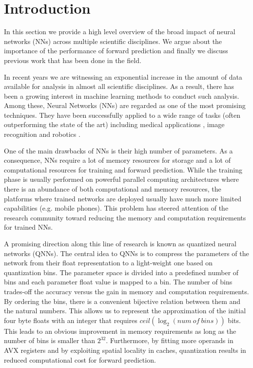 
\section{Introduction}\label{sec:intro}
In this section we provide a high level overview of the broad impact of neural networks (NNs) across multiple scientific disciplines. We argue about the importance of the performance of forward prediction and finally we discuss previous work that has been done in the field.

 In recent years we are witnessing an exponential increase in the amount of data available for analysis in almost all scientific disciplines. As a result, there has been a growing interest in machine learning methods to conduct such analysis. Among these, Neural Networks (NNs) are regarded as one of the most promising techniques. 
They have been successfully applied to a wide range of tasks (often outperforming the state of the art) including medical applications \cite{amato_artificial_2013}, image recognition \cite{krizhevsky_imagenet_2012} and robotics \cite{gu_deep_2016}. 

One of the main drawbacks of NNs is their high number of parameters. As a consequence, NNs require a lot of memory resources for storage and a lot of computational resources for training and forward prediction. While the training phase is usually performed on powerful parallel computing architectures where there is an abundance of both computational and memory resources, the platforms where  trained networks are deployed usually have much more limited capabilities (e.g. mobile phones). This problem has steered attention of the research community toward reducing the memory and computation requirements for trained NNs.

A promising direction along this line of research is known as quantized neural networks (QNNs). The central idea to QNNs is to compress the parameters of the network from their float representation to a light-weight one based on quantization bins. The parameter space is divided into a predefined number of bins and each parameter float value is mapped to a bin. The number of bins trades-off the accuracy versus the gain in memory and computation requirements. By ordering the bins, there is a convenient bijective relation between them and the natural numbers. This allows us to represent the approximation of the initial four byte floats with an integer that requires $ceil(\log_2({num~of~bins}))$ bits. This leads to an obvious improvement in memory requirements as long as the number of bins is smaller than $2^{32}$. Furthermore, by fitting more operands in AVX registers and by exploiting spatial locality in caches, quantization results in reduced computational cost for forward prediction.

